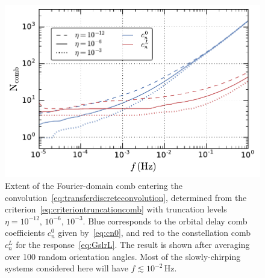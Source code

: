 \documentclass[aps,showpacs,twocolumn,
prd,superscriptaddress,nofootinbib]{revtex4-1}
\newcommand{\Hz}{\,\mathrm{Hz}}
\begin{document}
\begin{figure}
  \centering
  \includegraphics[width=.98\linewidth]{plots/LISACombExtent_py.pdf}
  \caption{Extent of the Fourier-domain comb entering the convolution~\eqref{eq:transferdiscreteconvolution}, determined from the criterion~\eqref{eq:criteriontruncationcomb} with truncation levels $\eta=10^{-12}$, $10^{-6}$, $10^{-3}$. Blue corresponds to the orbital delay comb coefficients $c_{n}^{0}$ given by~\eqref{eq:cn0}, and red to the constellation comb $c_{n}^{L}$ for the response~\eqref{eq:GslrL}. The result is shown after averaging over 100 random orientation angles. Most of the slowly-chirping systems considered here will have $f \lesssim 10^{-2}\Hz$.}
  \label{fig:lisacombextent}
\end{figure}
\end{document}
